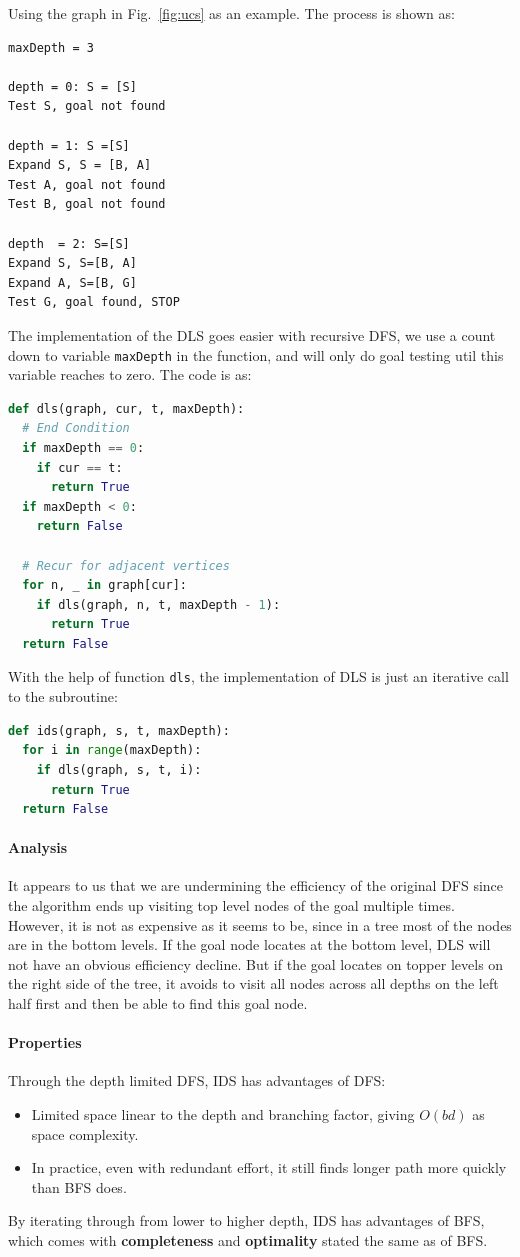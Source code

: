 \documentclass[main.tex]{subfiles}
\begin{document}
Using the graph in Fig.~\ref{fig:ucs} as an example. The process is shown as:
\begin{lstlisting}[numbers=none]
maxDepth = 3

depth = 0: S = [S]
Test S, goal not found

depth = 1: S =[S]
Expand S, S = [B, A]
Test A, goal not found
Test B, goal not found

depth  = 2: S=[S]
Expand S, S=[B, A]
Expand A, S=[B, G]
Test G, goal found, STOP
\end{lstlisting}
The implementation of the DLS goes easier with recursive DFS, we use a count down to variable \texttt{maxDepth} in the function, and will only do goal testing util this variable reaches to zero. The code is as:
\begin{lstlisting}[language=Python]
def dls(graph, cur, t, maxDepth):
  # End Condition
  if maxDepth == 0:
    if cur == t:
      return True
  if maxDepth < 0:
    return False

  # Recur for adjacent vertices
  for n, _ in graph[cur]:
    if dls(graph, n, t, maxDepth - 1):
      return True
  return False
\end{lstlisting}
With the help of function \texttt{dls}, the implementation of DLS is just an iterative call to the subroutine:
\begin{lstlisting}[language=Python]
def ids(graph, s, t, maxDepth):
  for i in range(maxDepth):
    if dls(graph, s, t, i):
      return True
  return False
\end{lstlisting}
\paragraph{Analysis} It appears to us that we are undermining the efficiency of the original DFS since the algorithm ends up visiting top level nodes of the goal multiple times. However, it is not as expensive as it seems to be, since in a tree most of the nodes are in the bottom levels. If the goal node locates at the bottom level, DLS will not have an obvious efficiency decline. But if the goal locates on topper levels on the right side of the tree, it avoids to visit all nodes across all depths on the left half first and then be able to find this goal node.
\paragraph{Properties} Through the depth limited DFS, IDS has advantages of DFS: 
\begin{itemize}
    \item Limited space linear to the depth and branching factor, giving $O(bd)$ as space complexity.
    \item In practice, even with redundant effort, it still finds longer path more quickly than BFS does.
\end{itemize}
By iterating through from lower to higher depth, IDS has advantages of BFS, which comes with \textbf{completeness} and \textbf{optimality} stated the same as of BFS. 
\end{document}
